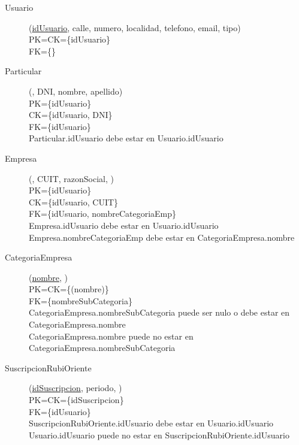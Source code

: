 \begin{description}

 \item[Usuario](\underline{idUsuario}, calle, numero, localidad, telefono, email, tipo)\\
PK=CK=\{idUsuario\}\\
FK=\{\}

 \item[Particular](\underline{}, DNI, nombre, apellido)\\
PK=\{idUsuario\}\\
CK=\{idUsuario, DNI\}\\
FK=\{idUsuario\}\\
Particular.idUsuario debe estar en Usuario.idUsuario

 \item[Empresa](\underline{}, CUIT, razonSocial, )\\
PK=\{idUsuario\}\\
CK=\{idUsuario, CUIT\}\\
FK=\{idUsuario, nombreCategoriaEmp\}\\
Empresa.idUsuario debe estar en Usuario.idUsuario\\
Empresa.nombreCategoriaEmp debe estar en CategoriaEmpresa.nombre

 \item[CategoriaEmpresa](\underline{nombre}, )\\
PK=CK=\{(nombre)\}\\
FK=\{nombreSubCategoria\}\\
CategoriaEmpresa.nombreSubCategoria puede ser nulo o debe estar en CategoriaEmpresa.nombre\\
CategoriaEmpresa.nombre puede no estar en CategoriaEmpresa.nombreSubCategoria

 \item[SuscripcionRubiOriente](\underline{idSuscripcion}, periodo, )\\
PK=CK=\{idSuscripcion\}\\
FK=\{idUsuario\}\\
SuscripcionRubiOriente.idUsuario debe estar en Usuario.idUsuario\\
Usuario.idUsuario puede no estar en SuscripcionRubiOriente.idUsuario


\end{description}
